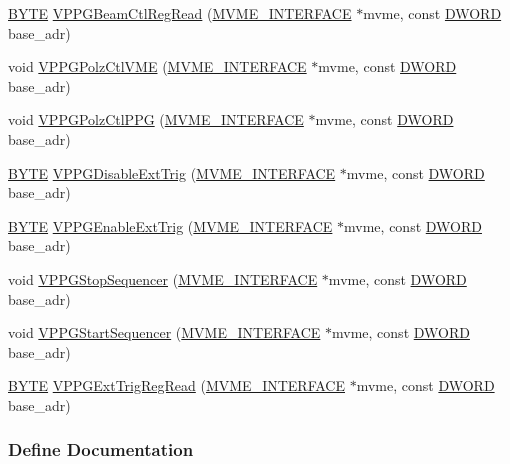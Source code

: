 \begin{DoxyCompactItemize}
\item 
\hyperlink{vt2_8h_a4ae1dab0fb4b072a66584546209e7d58}{BYTE} \hyperlink{vppg_8h_a57fead0a3fec6c6b119298e43a26a3e5}{VPPGBeamCtlRegRead} (\hyperlink{structMVME__INTERFACE}{MVME\_\-INTERFACE} $\ast$mvme, const \hyperlink{vt2_8h_a798af1e30bc65f319c1a246cecf59e39}{DWORD} base\_\-adr)
\item 
void \hyperlink{vppg_8h_a070407a7d64392ec20ad840d44ffb01c}{VPPGPolzCtlVME} (\hyperlink{structMVME__INTERFACE}{MVME\_\-INTERFACE} $\ast$mvme, const \hyperlink{vt2_8h_a798af1e30bc65f319c1a246cecf59e39}{DWORD} base\_\-adr)
\item 
void \hyperlink{vppg_8h_a28d2b68c7c0e8d305cc8dd37edfd7dec}{VPPGPolzCtlPPG} (\hyperlink{structMVME__INTERFACE}{MVME\_\-INTERFACE} $\ast$mvme, const \hyperlink{vt2_8h_a798af1e30bc65f319c1a246cecf59e39}{DWORD} base\_\-adr)
\item 
\hyperlink{vt2_8h_a4ae1dab0fb4b072a66584546209e7d58}{BYTE} \hyperlink{vppg_8h_a137e2408b777c360d4adc12f37ed90e6}{VPPGDisableExtTrig} (\hyperlink{structMVME__INTERFACE}{MVME\_\-INTERFACE} $\ast$mvme, const \hyperlink{vt2_8h_a798af1e30bc65f319c1a246cecf59e39}{DWORD} base\_\-adr)
\item 
\hyperlink{vt2_8h_a4ae1dab0fb4b072a66584546209e7d58}{BYTE} \hyperlink{vppg_8h_ad4f1d654e1523b2adb0a8007a4eedbef}{VPPGEnableExtTrig} (\hyperlink{structMVME__INTERFACE}{MVME\_\-INTERFACE} $\ast$mvme, const \hyperlink{vt2_8h_a798af1e30bc65f319c1a246cecf59e39}{DWORD} base\_\-adr)
\item 
void \hyperlink{vppg_8h_acabc3ac9c2749e8ad0d503643f3e48e3}{VPPGStopSequencer} (\hyperlink{structMVME__INTERFACE}{MVME\_\-INTERFACE} $\ast$mvme, const \hyperlink{vt2_8h_a798af1e30bc65f319c1a246cecf59e39}{DWORD} base\_\-adr)
\item 
void \hyperlink{vppg_8h_aa631062dec5475b71398bf970501a81b}{VPPGStartSequencer} (\hyperlink{structMVME__INTERFACE}{MVME\_\-INTERFACE} $\ast$mvme, const \hyperlink{vt2_8h_a798af1e30bc65f319c1a246cecf59e39}{DWORD} base\_\-adr)
\item 
\hyperlink{vt2_8h_a4ae1dab0fb4b072a66584546209e7d58}{BYTE} \hyperlink{vppg_8h_a39c304959840cd2c1a0812a4c6ac0ee6}{VPPGExtTrigRegRead} (\hyperlink{structMVME__INTERFACE}{MVME\_\-INTERFACE} $\ast$mvme, const \hyperlink{vt2_8h_a798af1e30bc65f319c1a246cecf59e39}{DWORD} base\_\-adr)
\end{DoxyCompactItemize}


\subsubsection{Define Documentation}
